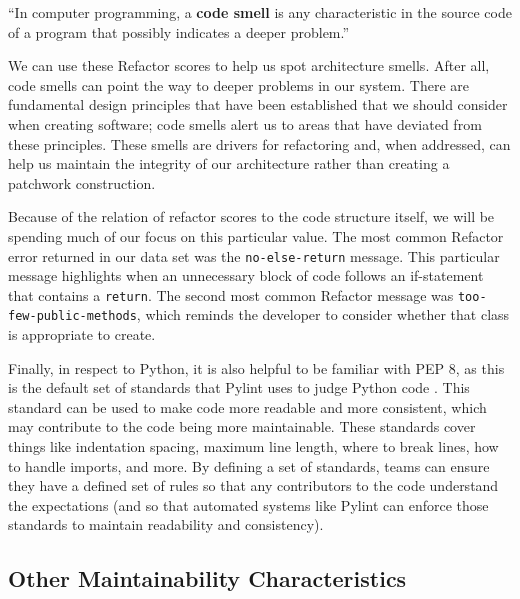 \documentclass[12pt,conference]{IEEEtran}
\newcommand\todo[1]{\textcolor{red}{#1}}
\newcommand{\code}[1]{\texttt{#1}}
\begin{document}
\vspace{0.25cm}
\begin{displayquote}
``In computer programming, a \textbf{code smell} is any characteristic in the source code of a program that possibly indicates a deeper problem.'' \cite{wiki:code-smells}
\end{displayquote}
\vspace{0.25cm}

We can use these Refactor scores to help us spot architecture smells. After all, code smells can point the way to deeper problems in our system. There are fundamental design principles that have been established that we should consider when creating software; code smells alert us to areas that have deviated from these principles. These smells are drivers for refactoring and, when addressed, can help us maintain the integrity of our architecture rather than creating a patchwork construction.

Because of the relation of refactor scores to the code structure itself, we will be spending much of our focus on this particular value. The most common Refactor error returned in our data set was the \code{no-else-return} message. This particular message highlights when an unnecessary block of code follows an if-statement that contains a \code{return}. The second most common Refactor message was \code{too-few-public-methods}, which reminds the developer to consider whether that class is appropriate to create.

Finally, in respect to Python, it is also helpful to be familiar with PEP 8, as this is the default set of standards that Pylint uses to judge Python code \cite{pylint:pep8}. This standard can be used to make code more readable and more consistent, which may contribute to the code being more maintainable. These standards cover things like indentation spacing, maximum line length, where to break lines, how to handle imports, and more. By defining a set of standards, teams can ensure they have a defined set of rules so that any contributors to the code understand the expectations (and so that automated systems like Pylint can enforce those standards to maintain readability and consistency).


\vspace{0.25cm}
\subsection{Other Maintainability Characteristics}
\end{document}
